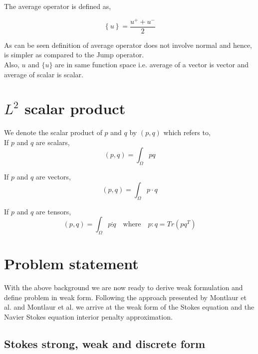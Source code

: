 \documentclass[a4paper,openany]{book}
\begin{document}
The average operator is defined as,

\begin{equation}\label{average operator}
\left\lbrace u \right\rbrace = \frac{u^+ + u^-}{2}  
\end{equation} 

As can be seen definition of average operator does not involve normal and hence, is simpler as compared to the Jump operator.\\
Also, $u$ and $\lbrace u \rbrace$ are in same function space i.e. average of a vector is vector and average of scalar is scalar.\\

\section{$L^2$ scalar product}

We denote the scalar product of $p$ and $q$ by $(p,q)$ which refers to,\\

If $p$ and $q$ are scalars,
\begin{equation}\label{inner product scalars}
(p,q)=\int_{\Omega} pq
\end{equation}

If $p$ and $q$ are vectors,
\begin{equation}\label{Inner product vectors}
(p,q)=\int_{\Omega} p \cdot q 
\end{equation}

If $p$ and $q$ are tensors,
\begin{equation}\label{Inner product tensors}
(p,q)=\int_{\Omega} p \vdots q \quad \textrm{where} \quad p:q = Tr(pq^T)
\end{equation}

\section{Problem statement}

With the above background we are now ready to derive weak formulation and define problem in weak form. Following the approach presented by Montlaur et al. \cite{Montlaur} and Montlaur et al. \cite{Montlaur2} we arrive at the weak form of the Stokes equation and the Navier Stokes equation interior penalty approximation.

\subsection{Stokes strong, weak and discrete form} \label{Stokes_flow_ch3}
\end{document}
